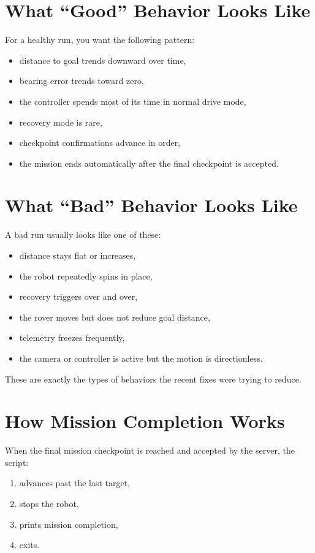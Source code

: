 \documentclass[11pt]{article}
\begin{document}
\section*{What ``Good'' Behavior Looks Like}
For a healthy run, you want the following pattern:
\begin{itemize}[leftmargin=*]
\item distance to goal trends downward over time,
\item bearing error trends toward zero,
\item the controller spends most of its time in normal drive mode,
\item recovery mode is rare,
\item checkpoint confirmations advance in order,
\item the mission ends automatically after the final checkpoint is accepted.
\end{itemize}

\section*{What ``Bad'' Behavior Looks Like}
A bad run usually looks like one of these:
\begin{itemize}[leftmargin=*]
\item distance stays flat or increases,
\item the robot repeatedly spins in place,
\item recovery triggers over and over,
\item the rover moves but does not reduce goal distance,
\item telemetry freezes frequently,
\item the camera or controller is active but the motion is directionless.
\end{itemize}

These are exactly the types of behaviors the recent fixes were trying to reduce.

\section*{How Mission Completion Works}
When the final mission checkpoint is reached and accepted by the server, the script:
\begin{enumerate}[leftmargin=*]
\item advances past the last target,
\item stops the robot,
\item prints mission completion,
\item exits.
\end{enumerate}
\end{document}
